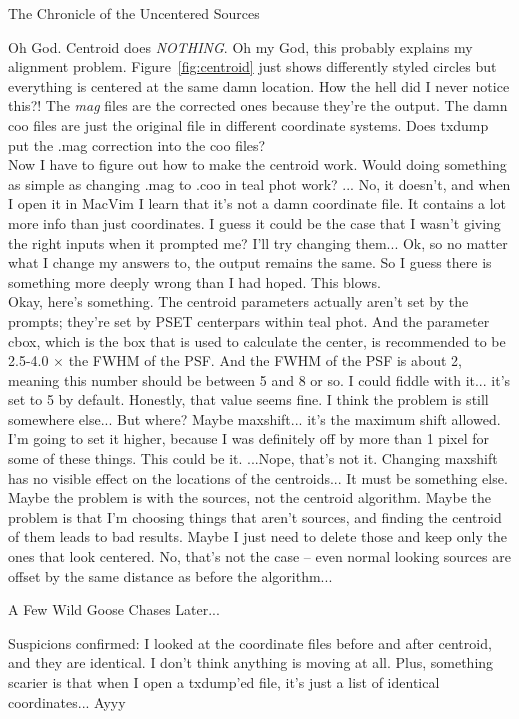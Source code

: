 \documentclass[11pt,obeyspaces]{article} %
\begin{document}
\begin{oframed}
\centerline{\sc The Chronicle of the Uncentered Sources}
Oh God. Centroid does \textit{NOTHING}. Oh my God, this probably explains my alignment problem. Figure~\ref{fig:centroid} just shows differently styled circles but everything is centered at the same damn location. How the hell did I never notice this?! The \textit{mag} files are the corrected ones because they're the output. The damn coo files are just the original file in different coordinate systems. Does txdump put the .mag correction into the coo files? \\
Now I have to figure out how to make the centroid work. Would doing something as simple as changing .mag to .coo in teal phot work? ... No, it doesn't, and when I open it in MacVim I learn that it's not a damn coordinate file. It contains a lot more info than just coordinates. I guess it could be the case that I wasn't giving the right inputs when it prompted me? I'll try changing them... Ok, so no matter what I change my answers to, the output remains the same. So I guess there is something more deeply wrong than I had hoped. This blows. \\ 
Okay, here's something. The centroid parameters actually aren't set by the prompts; they're set by PSET centerpars within teal phot. And the parameter cbox, which is the box that is used to calculate the center, is recommended to be 2.5-4.0 $\times$ the FWHM of the PSF. And the FWHM of the PSF is about 2, meaning this number should be between 5 and 8 or so. I could fiddle with it... it's set to 5 by default. Honestly, that value seems fine. I think the problem is still somewhere else... But where? Maybe maxshift... it's the maximum shift allowed. I'm going to set it higher, because I was definitely off by more than 1 pixel for some of these things. This could be it. ...Nope, that's not it. Changing maxshift has no visible effect on the locations of the centroids... It must be something else. Maybe the problem is with the sources, not the centroid algorithm. Maybe the problem is that I'm choosing things that aren't sources, and finding the centroid of them leads to bad results. Maybe I just need to delete those and keep only the ones that look centered. No, that's not the case -- even normal looking sources are offset by the same distance as before the algorithm...\\

\centerline{A Few Wild Goose Chases Later...}
Suspicions confirmed: I looked at the coordinate files before and after centroid, and they are identical. I don't think anything is moving at all. Plus, something scarier is that when I open a txdump'ed file, it's just a list of identical coordinates... Ayyy \\


\end{oframed}
\end{document}
